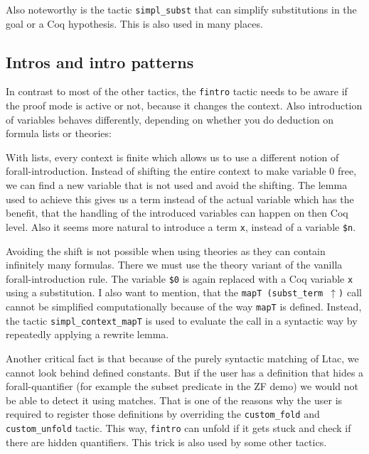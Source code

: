 \documentclass[12pt, a4paper]{article}
\begin{document}
\medskip\noindent
Also noteworthy is the tactic \texttt{simpl\_subst} that can simplify substitutions in the goal or a Coq hypothesis.
This is also used in many places.



\subsection{Intros and intro patterns}

In contrast to most of the other tactics, the \texttt{fintro} tactic needs to be aware if the proof mode is active or not, because it changes the context.
Also introduction of variables behaves differently, depending on whether you do deduction on formula lists or theories:

\medskip\noindent
With lists, every context is finite which allows us to use a different notion of forall-introduction.
Instead of shifting the entire context to make variable 0 free, we can find a new variable that is not used and avoid the shifting.
The lemma used to achieve this gives us a term instead of the actual variable which has the benefit, that the handling of the introduced variables can happen on then Coq level.
Also it seems more natural to introduce a term \texttt{x}, instead of a variable \texttt{\$n}.

Avoiding the shift is not possible when using theories as they can contain infinitely many formulas.
There we must use the theory variant of the vanilla forall-introduction rule.
The variable \texttt{\$0} is again replaced with a Coq variable \texttt{x} using a substitution.
I also want to mention, that the \texttt{mapT (subst\_term $\uparrow$)} call cannot be simplified computationally because of the way \texttt{mapT} is defined.
Instead, the tactic \texttt{simpl\_context\_mapT} is used to evaluate the call in a syntactic way by repeatedly applying a rewrite lemma.

\medskip\noindent
Another critical fact is that because of the purely syntactic matching of Ltac, we cannot look behind defined constants.
But if the user has a definition that hides a forall-quantifier (for example the subset predicate in the ZF demo) we would not be able to detect it using matches.
That is one of the reasons why the user is required to register those definitions by overriding the \texttt{custom\_fold} and \texttt{custom\_unfold} tactic.
This way, \texttt{fintro} can unfold if it gets stuck and check if there are hidden quantifiers.
This trick is also used by some other tactics.
\end{document}
